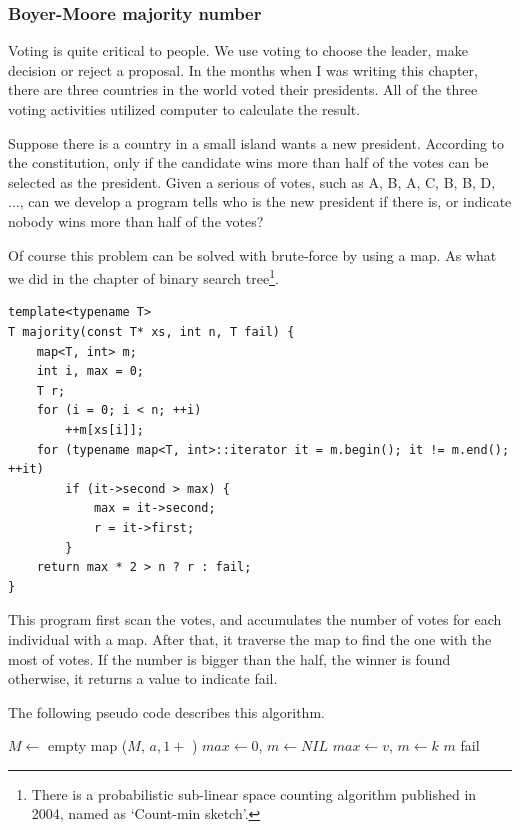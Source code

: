 \documentclass[UTF8]{article}
\begin{document}
\subsubsection{Boyer-Moore majority number}

Voting is quite critical to people. We use voting to choose the leader, make decision or reject a
proposal. In the months when I was writing this chapter, there are three countries in the world voted their
presidents. All of the three voting activities utilized computer to calculate the result.

Suppose there is a country in a small island wants a new president. According to the constitution,
only if the candidate wins more than half of the votes can be selected as the
president. Given a serious of votes, such as A, B, A, C, B, B, D, ...,
can we develop a program tells who is the new president if there is,
or indicate nobody wins more than half of the votes?

Of course this problem can be solved with brute-force by using a map. As what we did in the chapter
of binary search tree\footnote{There is a probabilistic sub-linear space counting algorithm published
in 2004, named as `Count-min sketch'\cite{count-min-sketch}.}.

\lstset{language=C++}
\begin{lstlisting}
template<typename T>
T majority(const T* xs, int n, T fail) {
    map<T, int> m;
    int i, max = 0;
    T r;
    for (i = 0; i < n; ++i)
        ++m[xs[i]];
    for (typename map<T, int>::iterator it = m.begin(); it != m.end(); ++it)
        if (it->second > max) {
            max = it->second;
            r = it->first;
        }
    return max * 2 > n ? r : fail;
}
\end{lstlisting}

This program first scan the votes, and accumulates the number of votes for each individual with a map.
After that, it traverse the map to find the one with the most of votes. If the number is bigger
than the half, the winner is found otherwise, it returns a value to indicate fail.

The following pseudo code describes this algorithm.

\begin{algorithmic}[1]
  \State $M \gets $ empty map
    \State {}($M$, $a, 1 + $ )
  \EndFor
  \State $max \gets 0$, $m \gets NIL$
      \State $max \gets v$, $m \gets k$
    \EndIf
  \EndFor
    \State \Return $m$
  \Else
    \State fail
  \EndIf
\EndFunction
\end{algorithmic}
\end{document}
